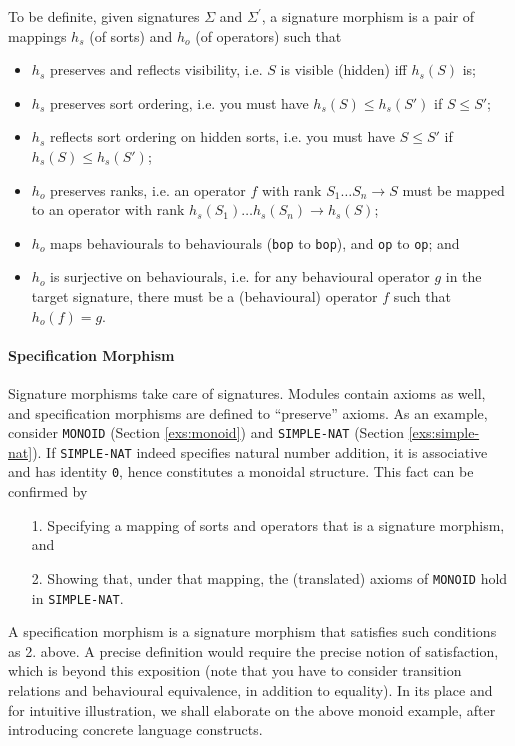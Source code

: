 \documentclass[a4paper]{memoir}
\begin{document}
To be definite, given signatures $\Sigma$ and $\Sigma^{\prime}$,
a signature morphism is a pair of
mappings $h_s$ (of sorts) and $h_o$ (of operators) such that
\begin{itemize}
\item $h_s$ preserves and reflects visibility, i.e. $S$ is visible
  (hidden) iff $h_s(S)$ is;
\item $h_s$ preserves sort ordering, i.e. you must have
  $h_s(S) \leq h_s(S')$ if $S \leq S'$;
\item $h_s$ reflects sort ordering on hidden sorts, i.e.
  you must have $S \leq S'$ if $h_s(S) \leq h_s(S')$;
\item $h_o$ preserves ranks, i.e. an operator $f$ with rank
  $S_1 \ldots S_n \to S$ must be mapped to an operator
  with rank $h_s(S_1) \ldots h_s(S_n) \to h_s(S)$;
\item $h_o$ maps behaviourals to behaviourals (\verb|bop| to \verb|bop|),
  and \verb|op| to \verb|op|; and
\item $h_o$ is surjective on behaviourals, i.e. for any behavioural
  operator $g$ in the target signature,
  there must be a (behavioural) operator $f$ such that $h_o(f) = g$.
\end{itemize}

\paragraph{Specification Morphism}

Signature morphisms take care of signatures. Modules contain
axioms as well, and specification morphisms are defined to
``preserve'' axioms. As an example, consider \verb|MONOID|
(Section \ref{exs:monoid}) and \verb|SIMPLE-NAT|
(Section \ref{exs:simple-nat}). If \verb|SIMPLE-NAT| indeed specifies
natural number addition, it is associative and has identity \verb|0|,
hence constitutes a monoidal structure. This fact can be confirmed by
\begin{itemize}
\item[1.] Specifying a mapping of sorts and operators that is a
 signature morphism, and
\item[2.] Showing that, under that mapping, the (translated)
  axioms of \verb|MONOID| hold in \verb|SIMPLE-NAT|.
\end{itemize}
A specification morphism is a signature morphism that satisfies such
conditions as 2. above. A precise definition would require the
precise notion of satisfaction, which is beyond this exposition
(note that you have to consider transition relations
and behavioural equivalence, in addition to equality).
In its place and for intuitive illustration, we shall elaborate on the above
monoid example, after introducing concrete language constructs.
\end{document}
